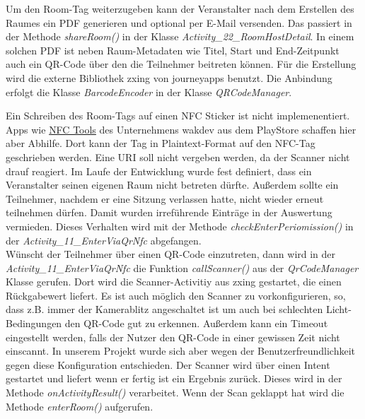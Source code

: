 Um den Room-Tag weiterzugeben kann der Veranstalter nach dem Erstellen des Raumes ein PDF generieren und optional per E-Mail versenden. 
Das passiert in der Methode \textit{shareRoom()} in der Klasse \textit{Activity\_22\_RoomHostDetail}. 
In einem solchen PDF ist neben Raum-Metadaten wie Titel, Start und End-Zeitpunkt auch ein QR-Code über den die Teilnehmer beitreten können. 
Für die Erstellung wird die externe Bibliothek zxing von journeyapps benutzt. Die Anbindung erfolgt die Klasse \textit{BarcodeEncoder} in der Klasse \textit{QRCodeManager}. 

Ein Schreiben des Room-Tags auf einen NFC Sticker ist nicht implemenentiert.
 Apps wie \href{https://play.google.com/store/apps/details?id=com.wakdev.wdnfc&hl=de&gl=US}{NFC Tools} des Unternehmens wakdev aus dem PlayStore schaffen hier aber Abhilfe. 
Dort kann der Tag in Plaintext-Format auf den NFC-Tag 
 geschrieben werden.
Eine URI soll nicht vergeben werden, da der Scanner nicht drauf reagiert.
Im Laufe der Entwicklung  wurde fest definiert, dass ein Veranstalter seinen eigenen Raum nicht betreten dürfte.
 Außerdem sollte ein Teilnehmer, nachdem er eine Sitzung verlassen hatte, nicht wieder erneut teilnehmen dürfen. 
 Damit wurden irreführende Einträge in der Auswertung vermieden. Dieses Verhalten wird mit der Methode \textit{checkEnterPeriomission()} in der \textit{Activity\_11\_EnterViaQrNfc} abgefangen.
\\ 
Wünscht der Teilnehmer über einen QR-Code einzutreten, dann wird in der \textit{Activity\_11\_EnterViaQrNfc} die Funktion \textit{callScanner()} aus der \textit{QrCodeManager} Klasse gerufen. 
Dort wird die Scanner-Activitiy aus zxing gestartet, die einen Rückgabewert liefert. 
Es ist auch möglich den Scanner zu vorkonfigurieren, so, dass z.B. immer der Kamerablitz angeschaltet ist um auch bei schlechten Licht-Bedingungen den QR-Code gut zu erkennen. 
Außerdem kann ein Timeout eingestellt werden, falls der Nutzer den QR-Code in einer gewissen Zeit nicht einscannt.
In unserem Projekt wurde sich aber wegen der Benutzerfreundlichkeit gegen diese Konfiguration entschieden.
Der Scanner wird über einen Intent gestartet und liefert wenn er fertig ist ein Ergebnis zurück.
Dieses wird in der Methode \textit{onActivityResult()} verarbeitet. Wenn der Scan geklappt hat wird die Methode \textit{enterRoom()} aufgerufen. 
